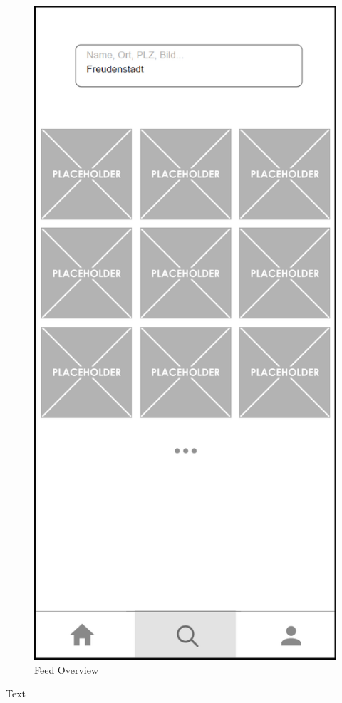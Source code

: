 \begin{figure}[H]
\begin{minipage}{.5\textwidth}
      \includegraphics[width=.8\linewidth]{images/Feed_Overview_MockUp.png}
      \caption{Feed Overview}
      \label{fig:feed_overview}
    \end{minipage}
\end{figure}

Text


